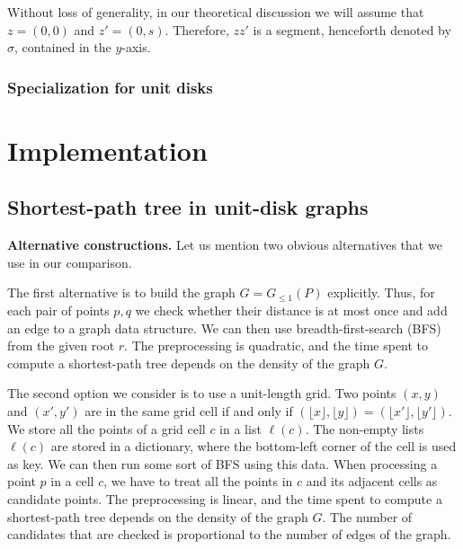 \documentclass[a4paper,USenglish,numberwithinsect]{lipics}
\newcommand{\GG}{\ensuremath{G_{\le 1}}}
\let\le\leqslant
\def\myparagraph#1{\medskip\noindent\textbf{#1.}}
\begin{document}


Without loss of generality, in our theoretical discussion we will assume
that $z=(0,0)$ and $z'=(0,s)$. Therefore, $zz'$ is a segment, henceforth denoted by $\sigma$,
contained in the $y$-axis.

\subsubsection{Specialization for unit disks}




\section{Implementation}
\label{sec:implementation}

\subsection{Shortest-path tree in unit-disk graphs}
\label{sec:implementation-sptree}

\myparagraph{Alternative constructions} 
Let us mention two obvious alternatives that we use in our comparison.

The first alternative is to build the graph $G=\GG(P)$ explicitly. 
Thus, for each pair of points $p,q$ we check whether their distance is
at most once and add an edge to a graph data structure.
We can then use breadth-first-search (BFS) from the given root $r$.
The preprocessing is quadratic, and the time spent to compute
a shortest-path tree depends on the density of the graph $G$.

The second option we consider is to use a unit-length grid. 
Two points $(x,y)$ and $(x',y')$ are in the same grid cell
if and only if 
$(\lfloor x\rfloor ,\lfloor y\rfloor)=(\lfloor x'\rfloor ,\lfloor y'\rfloor)$.
We store all the points of a grid cell $c$ in a list $\ell(c)$.
The non-empty lists $\ell(c)$ are stored in a dictionary,
where the bottom-left corner of the cell is used as key.
We can then run some sort of BFS using this data. When processing
a point $p$ in a cell $c$, we have to treat all the points 
in $c$ and its adjacent cells as candidate points. 
The preprocessing is linear, and the time spent to compute
a shortest-path tree depends on the density of the graph $G$.
The number of candidates that are checked is proportional to the
number of edges of the graph.
\end{document}
